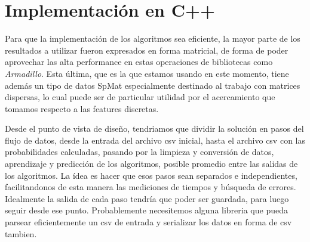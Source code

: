 \section{Implementación en C++}
Para que la implementación de los algoritmos sea eficiente, la mayor parte de los resultados a utilizar fueron expresados en forma matricial, de forma de poder aprovechar las alta performance en estas operaciones de bibliotecas como \textit{Armadillo}. Esta última, que es la que estamos usando en este momento, tiene además un tipo de datos SpMat especialmente destinado al trabajo con matrices dispersas, lo cual puede ser de particular utilidad por el acercamiento que tomamos respecto a las features discretas.

Desde el punto de vista de diseño, tendriamos que dividir la solución en pasos del flujo de datos, desde la entrada del archivo csv inicial, hasta el archivo csv con las probabilidades calculadas, pasando por la limpieza y conversión de datos, aprendizaje y predicción de los algoritmos, posible promedio entre las salidas de los algoritmos. La ídea es hacer que esos pasos sean separados e independientes, facilitandonos de esta manera las mediciones de tiempos y búsqueda de errores. Idealmente la salida de cada paso tendría que poder ser guardada, para luego seguir desde ese punto. Probablemente necesitemos alguna libreria que pueda parsear eficientemente un csv de entrada y serializar los datos en forma de csv tambien.
